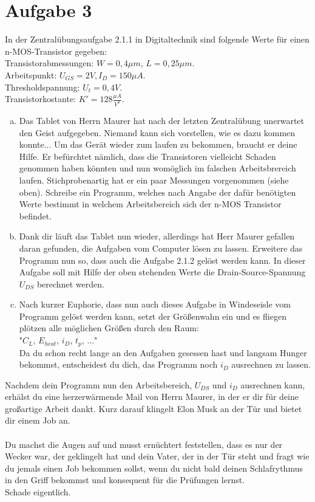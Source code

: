 \documentclass{standalone}
\begin{document}
\section{Aufgabe 3}
    In der Zentralübungsaufgabe 2.1.1 in Digitaltechnik sind folgende Werte für einen 
    n-MOS-Transistor gegeben: \\
    Transistorabmessungen: $W = 0,4\mu m$, $L = 0,25\mu m$.\\
    Arbeitspunkt: $U_{GS} = 2V, I_D = 150\mu A$.\\
    Thresholdspannung: $U_t = 0,4V$.\\
    Transistorkostante: $K' = 128 \frac{\mu A}{V^2}$.

\begin{enumerate}[a)]
\item
    Das Tablet von Herrn Maurer hat nach der letzten Zentralübung unerwartet den Geist aufgegeben. Niemand
    kann sich vorstellen, wie es dazu kommen konnte...  Um das Gerät wieder zum laufen zu bekommen, braucht er deine Hilfe. 
    Er befürchtet nämlich, dass die Transistoren vielleicht Schaden genommen haben könnten und nun womöglich im falschen Arbeitsbrereich laufen.
    Stichprobenartig hat er ein paar Messungen vorgenommen (siehe oben). Schreibe ein Programm, welches nach Angabe der dafür benötigten 
    Werte bestimmt in welchem Arbeitsbereich sich der n-MOS Transistor befindet. 
    
\item 
    Dank dir läuft das Tablet nun wieder, allerdings hat Herr Maurer gefallen daran gefunden, die Aufgaben vom Computer lösen zu lassen.
    Erweitere das Programm nun so, dass auch die Aufgabe 2.1.2 gelöst werden kann. In dieser Aufgabe soll mit Hilfe der oben stehenden Werte
    die Drain-Source-Spannung $U_{DS}$ berechnet werden.

\item
    Nach kurzer Euphorie, dass nun auch dieses Aufgabe in Windeseisle vom Programm gelöst werden kann, setzt der Größenwahn ein und es fliegen
    plötzen alle möglichen Größen durch den Raum: \\
    "$C_L$, $E_{heat}$, $i_D$, $t_p$, ..." \\
    Da du schon recht lange an den Aufgaben gesessen hast und langsam Hunger bekommst, entscheidest du dich, das Programm noch $i_D$ ausrechnen zu lassen.

\end{enumerate}

Nachdem dein Programm nun den Arbeitsbereich, $U_{DS}$ und $i_D$ ausrechnen kann, erhälst du eine herzerwärmende Mail von Herrn Maurer, in der er dir 
für deine großartige Arbeit dankt. Kurz darauf klingelt Elon Musk an der Tür und bietet dir einem Job an.\\ \\

Du machst die Augen auf und musst ernüchtert feststellen, dass es nur der Wecker war, der geklingelt hat und dein Vater, der in der Tür steht und fragt wie du 
jemals einen Job bekommen sollst, wenn du nicht bald deinen Schlafrythmus in den Griff bekommst und konsequent für die Prüfungen lernst. \\
Schade eigentlich.
\end{document}

